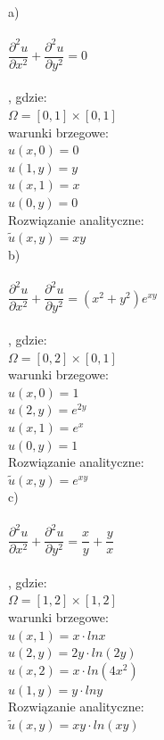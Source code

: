\begin{multicols}{3}
	a)\\\\$\dfrac{\partial^2 u}{\partial x^2} + \dfrac{\partial^2 u}{\partial y^2} = 0$\vspace{0.2cm}\\\\, gdzie:\\
	$\Omega = [0,1]\times[0,1]$\\
	warunki brzegowe:\\
	$u(x,0) = 0$\\
	$u(1,y) = y$\\
	$u(x,1) = x$\\
	$u(0,y) = 0$
	\vspace{0.1cm}\\
	Rozwiązanie analityczne:\\
	\columnbreak
	$\widetilde{u}(x,y) = xy$\\
	b)\\\\$\dfrac{\partial^2 u}{\partial x^2} + \dfrac{\partial^2 u}{\partial y^2} = (x^2+y^2)e^{xy}$\vspace{0.2cm}\\\\, gdzie:\\
	$\Omega = [0,2]\times[0,1]$\\
	warunki brzegowe:\\
	$u(x,0) = 1$\\
	$u(2,y) = e^{2y}$\\
	$u(x,1) = e^x$\\	
	$u(0,y) = 1$
	\vspace{0.1cm}\\
	Rozwiązanie analityczne:\\
	\columnbreak
	$\widetilde{u}(x,y) = e^{xy}$\\
	c)\\\\$\dfrac{\partial^2 u}{\partial x^2} + \dfrac{\partial^2 u}{\partial y^2} = \dfrac{x}{y} + \dfrac{y}{x}$\vspace{0cm}\\\\, gdzie:\\
	$\Omega = [1,2]\times[1,2]$\\
	warunki brzegowe:\\
	$u(x,1) = x\cdot lnx$\\
	$u(2,y) = 2y\cdot ln(2y)$\\
	$u(x,2) = x\cdot ln(4x^2)$\\
	$u(1,y) = y\cdot lny$
	\vspace{0.1cm}\\
	Rozwiązanie analityczne:\\
	$\widetilde{u}(x,y) = xy\cdot ln(xy)$
	
	
\end{multicols}
\newpage
